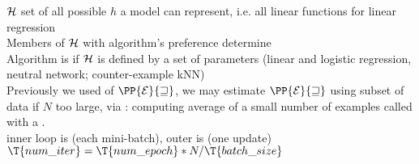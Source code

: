 \documentclass[10pt]{LatexTemplate/hw}
\begin{document}
\begin{multicols*}{5}
 $\cal{H}$ set of all possible $h$ a model can represent, i.e. all linear functions for linear regression\\
Members of $\cal{H}$ with algorithm's preference determine \\
Algorithm is  if $\cal{H}$ is defined by a set of parameters (linear and logistic regression, neutral network; counter-example kNN)\\
Previously we used  of $\PP{\cal{E}}{w}$, we may estimate $\PP{\cal{E}}{w}$ using subset of data if $N$ too large, via : computing average of a small number of examples called  with a .\\
inner loop is  (each mini-batch), outer is  (one update)\\
$\T{num\_iter}=\T{num\_epoch}* N / \T{batch\_size}$


\end{multicols*}
\end{document}
